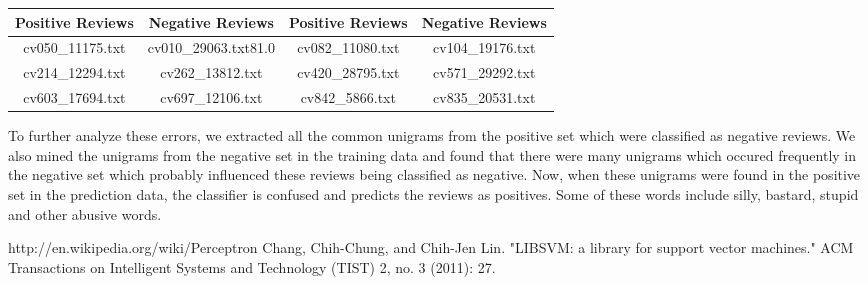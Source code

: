 \documentclass[11pt,a4paper]{article}
\begin{document}
\begin{enumerate}
			\begin{center}
				\begin{tabular}{|c|c|c|c|}
				\hline
				{\bf Positive Reviews } & {\bf Negative Reviews} & {\bf Positive Reviews} & {\bf Negative Reviews}\\\hline
				cv050\_11175.txt&	cv010\_29063.txt81.0	&cv082\_11080.txt & cv104\_19176.txt \\\hline
				cv214\_12294.txt	& cv262\_13812.txt	& cv420\_28795.txt & cv571\_29292.txt\\\hline
				cv603\_17694.txt &cv697\_12106.txt	&cv842\_5866.txt &cv835\_20531.txt\\\hline
				

				\end{tabular} 
			\end{center}
To further analyze these errors, we extracted all the common unigrams from the positive set which were classified as negative reviews. We also mined the unigrams from the negative set in the training data and found that there were many unigrams which occured frequently in the negative set which probably influenced these reviews being classified as negative. Now, when these unigrams were found in the positive set in the prediction data, the classifier is confused and predicts the reviews as positives. Some of these words include silly, bastard, stupid and other abusive words.
			

			\end{enumerate}
\begin{thebibliography}{1}
\bibitem{} http://en.wikipedia.org/wiki/Perceptron
\bibitem{} Chang, Chih-Chung, and Chih-Jen Lin. "LIBSVM: a library for support vector machines." ACM Transactions on Intelligent Systems and Technology (TIST) 2, no. 3 (2011): 27.

%
%
\end{thebibliography}		
		
\end{document}
